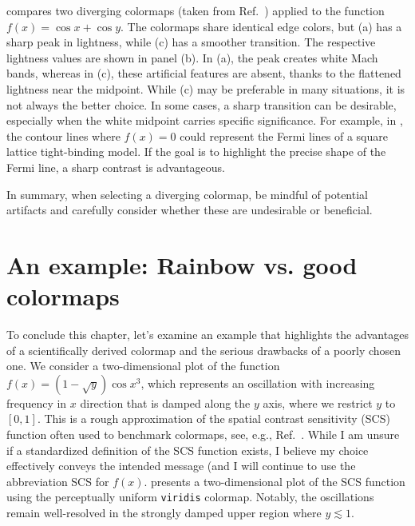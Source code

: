  compares two diverging colormaps (taken from Ref.~\cite{moreland2009}) applied to the function $f(x) = \cos x + \cos y$. The colormaps share identical edge colors, but (a) has a sharp peak in lightness, while (c) has a smoother transition. The respective lightness values are shown in panel (b). In (a), the peak creates white Mach bands, whereas in (c), these artificial features are absent, thanks to the flattened lightness near the midpoint.
While (c) may be preferable in many situations, it is not always the better choice. In some cases, a sharp transition can be desirable, especially when the white midpoint carries specific significance. For example, in , the contour lines where $f(x)=0$ could represent the Fermi lines of a square lattice tight-binding model. If the goal is to highlight the precise shape of the Fermi line, a sharp contrast is advantageous.

In summary, when selecting a diverging colormap, be mindful of potential artifacts and carefully consider whether these are undesirable or beneficial.

\section{An example: Rainbow vs. good colormaps}\label{sec:rainbow}

To conclude this chapter, let's examine an example that highlights the advantages of a scientifically derived colormap and the serious drawbacks of a poorly chosen one. We consider a two-dimensional plot of the function $f(x)= \left(1 - \sqrt{y} \right)  \cos x^3$, which represents an oscillation with increasing frequency in $x$ direction that is damped along the $y$ axis, where we restrict $y$ to $\left[0,1\right]$. This is a rough approximation of the spatial contrast sensitivity (SCS) function often used to benchmark colormaps, see, e.g., Ref.~\cite{moreland2009}. While I am unsure if a standardized definition of the SCS function exists, I believe my choice effectively conveys the intended message (and I will continue to use the abbreviation SCS for $f(x)$.
 presents a two-dimensional plot of the SCS function using the perceptually uniform \verb|viridis| colormap.
Notably, the oscillations remain well-resolved in the strongly damped upper region where $y \lesssim 1$.

